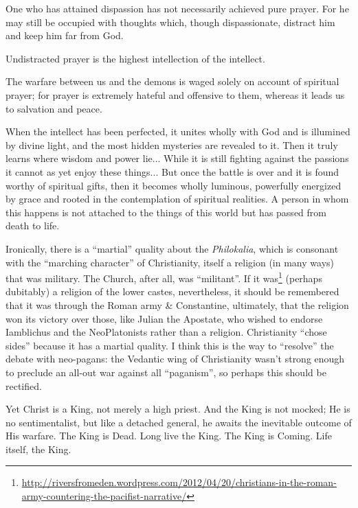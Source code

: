 \begin{quotationx}
One who has attained dispassion has not necessarily achieved pure prayer. For he may still be occupied with thoughts which, though dispassionate, distract him and keep him far from God.

Undistracted prayer is the highest intellection of the intellect.

The warfare between us and the demons is waged solely on account of spiritual prayer; for prayer is extremely hateful and offensive to them, whereas it leads us to salvation and peace.

When the intellect has been perfected, it unites wholly with God and is illumined by divine light, and the most hidden mysteries are revealed to it. Then it truly learns where wisdom and power lie... While it is still fighting against the passions it cannot as yet enjoy these things... But once the battle is over and it is found worthy of spiritual gifts, then it becomes wholly luminous, powerfully energized by grace and rooted in the contemplation of spiritual realities. A person in whom this happens is not attached to the things of this world but has passed from death to life.
\end{quotationx}


Ironically, there is a ``martial'' quality about the \emph{Philokalia}, which is consonant with the ``marching character'' of Christianity, itself a religion (in many ways) that was military. The Church, after all, was ``militant''. If it was\footnote{\url{http://riversfromeden.wordpress.com/2012/04/20/christians-in-the-roman-army-countering-the-pacifist-narrative/}} (perhaps dubitably) a religion of the lower castes, nevertheless, it should be remembered that it was through the Roman army \& Constantine, ultimately, that the religion won its victory over those, like Julian the Apostate, who wished to endorse Iamblichus and the NeoPlatonists rather than a religion. Christianity ``chose sides'' because it has a martial quality. I think this is the way to ``resolve'' the debate with neo-pagans: the Vedantic wing of Christianity wasn't strong enough to preclude an all-out war against all ``paganism'', so perhaps this should be rectified.

Yet Christ is a King, not merely a high priest. And the King is not mocked; He is no sentimentalist, but like a detached general, he awaits the inevitable outcome of His warfare. The King is Dead. Long live the King. The King is Coming. Life itself, the King.

